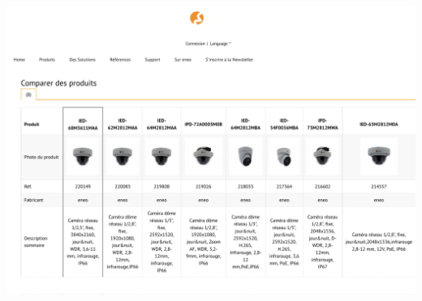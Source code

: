 \documentclass[12pt, french]{report}
\begin{document}
\includegraphics[width=\textwidth,page=5]{Dimensionnement/Comparatif.pdf}
\newpage
\label{biblio}
\printbibliography[title={Bibliographie}]
\end{document}
